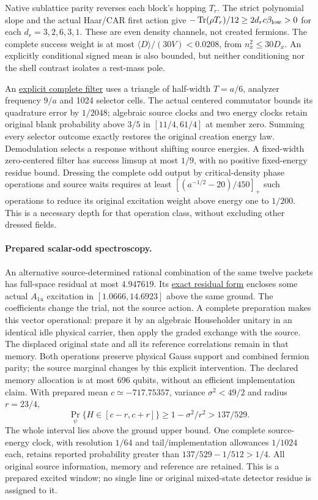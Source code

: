 Native sublattice parity reverses each block's hopping $T_r$.
The strict polynomial slope and the actual Haar/CAR first action give
$-\operatorname{Tr}(\rho T_r)/12\ge2d_r c\beta_{\rm low}>0$ for each
$d_r=3,2,6,3,1$. These are even density channels, not created fermions.
The complete success weight is at most
$\langle D\rangle/(30V)<0.0208$, from $n_x^2\le30D_x$.
An explicitly conditional signed mean is also bounded, but neither
conditioning nor the shell contrast isolates a rest-mass pole.

An \href{https://github.com/FloatingPragma/observer-patch-holography/blob/main/model/particle_primary_odd_low_energy/PROOF.md}{explicit complete filter}
uses a triangle of half-width $T=a/6$, analyzer frequency $9/a$ and
1024 selector cells. The actual centered commutator bounds its quadrature
error by $1/2048$; algebraic source clocks and two energy clocks retain
original blank probability above $3/5$ in $[11/4,61/4]$ at member zero.
Summing every selector outcome exactly restores the original creation
energy law. Demodulation selects a response without shifting source
energies. A fixed-width zero-centered filter has success limsup at most
$1/9$, with no positive fixed-energy residue bound. Dressing the complete
odd output by critical-density phase operations and source waits requires
at least $[(a^{-1/2}-20)/450]_+$ such operations to reduce its original
excitation weight above energy one to $1/200$. This is a necessary depth
for that operation class, without excluding other dressed fields.

\paragraph{Prepared scalar-odd spectroscopy.}
An alternative source-determined rational combination of the same twelve
packets has full-space residual at most $4.947619$. Its
\href{https://github.com/FloatingPragma/observer-patch-holography/blob/main/model/particle_primary_spectral_resolution/PROOF.md}{exact residual form}
encloses some actual $A_{1u}$ excitation in $[1.0666,14.6923]$ above the
same ground. The coefficients change the trial, not the source action.
A complete preparation makes this vector operational: prepare it by an
algebraic Householder unitary in an identical idle physical carrier, then
apply the graded exchange with the source. The displaced original state
and all its reference correlations remain in that memory. Both operations
preserve physical Gauss support and combined fermion parity; the source
marginal changes by this explicit intervention. The declared memory
allocation is at most 696 qubits, without an efficient implementation claim.
With prepared mean $c\simeq-717.75357$, variance $\sigma^2<49/2$ and
radius $r=23/4$,
\[
 \Pr_\psi\{H\in[c-r,c+r]\}\ge1-\sigma^2/r^2>137/529.
\]
The whole interval lies above the ground upper bound. One complete
source-energy clock, with resolution $1/64$ and tail/implementation
allowances $1/1024$ each, retains reported probability greater than
$137/529-1/512>1/4$. All original source information, memory and reference
are retained. This is a prepared excited window; no single line or
original mixed-state detector residue is assigned to it.


